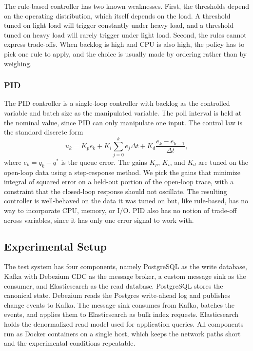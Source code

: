 \documentclass[10pt,a4paper]{article}
\begin{document}
The rule-based controller has two known weaknesses. First, the thresholds depend on the operating distribution, which itself depends on the load. A threshold tuned on light load will trigger constantly under heavy load, and a threshold tuned on heavy load will rarely trigger under light load. Second, the rules cannot express trade-offs. When backlog is high and CPU is also high, the policy has to pick one rule to apply, and the choice is usually made by ordering rather than by weighing.

\subsubsection{PID}

The PID controller is a single-loop controller with backlog as the controlled variable and batch size as the manipulated variable. The poll interval is held at the nominal value, since PID can only manipulate one input. The control law is the standard discrete form
\begin{equation}
u_k = K_p e_k + K_i \sum_{j=0}^{k} e_j \Delta t + K_d \frac{e_k - e_{k-1}}{\Delta t},
\end{equation}
where $e_k = q_k - q^*$ is the queue error. The gains $K_p$, $K_i$, and $K_d$ are tuned on the open-loop data using a step-response method. We pick the gains that minimize integral of squared error on a held-out portion of the open-loop trace, with a constraint that the closed-loop response should not oscillate. The resulting controller is well-behaved on the data it was tuned on but, like rule-based, has no way to incorporate CPU, memory, or I/O. PID also has no notion of trade-off across variables, since it has only one error signal to work with.

\subsection{Experimental Setup}

The test system has four components, namely PostgreSQL as the write database, Kafka with Debezium CDC as the message broker, a custom message sink as the consumer, and Elasticsearch as the read database. PostgreSQL stores the canonical state. Debezium reads the Postgres write-ahead log and publishes change events to Kafka. The message sink consumes from Kafka, batches the events, and applies them to Elasticsearch as bulk index requests. Elasticsearch holds the denormalized read model used for application queries. All components run as Docker containers on a single host, which keeps the network paths short and the experimental conditions repeatable.
\end{document}
